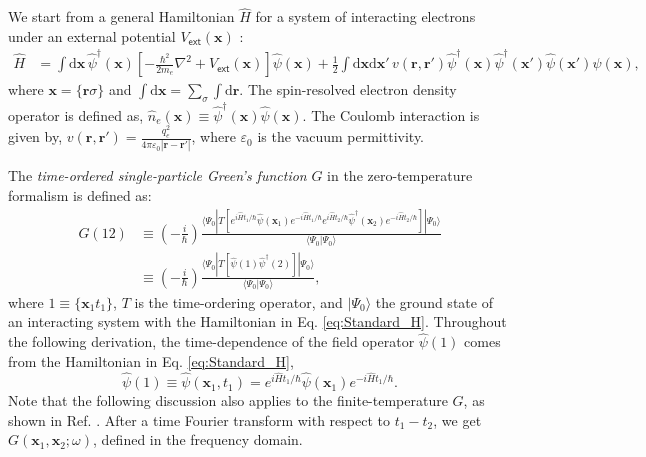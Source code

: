\documentclass[11pt, oneside]{article}          %
\begin{document}
We start from a general Hamiltonian $\hat{H}$ for a system of interacting electrons under an external potential $V_{\mathsf{ext}}({\bm x})$ \cite{cohen2016fundamentals, fetter2012quantum, mahan2013many, strinati1988application}:
\begin{equation}
  \label{eq:Standard_H}
  \begin{aligned}
    \hat{H} & = \int \mathrm{d}{\bm x} \, \hat{\psi}^{\dagger} ({\bm x}) \left [ -\frac{\hbar^2}{2m_e}\nabla^2 + V_{\mathsf{ext}} ({\bm x}) \right ] \hat{\psi}({\bm x}) + \frac{1}{2} \int \mathrm{d}{\bm x} \mathrm{d}{\bm x}' \, v({\bm r},{\bm r}') \hat{\psi}^{\dagger}({\bm x}) \hat{\psi}^{\dagger}({\bm x}') \hat{\psi}({\bm x}') \hat{\psi}({\bm x}),
  \end{aligned}
\end{equation}
where ${\bm x} = \{ {\bm r}\sigma \}$ and $\int \mathrm{d} {\bm x} = \sum_{\sigma} \int \mathrm{d}{\bm r}$. The spin-resolved electron density operator is defined as, $\hat{n}_e ({\bm x}) \equiv  \hat{\psi}^{\dagger}({\bm x}) \hat{\psi}({\bm x})$. The Coulomb interaction is given by, $v({\bm r},{\bm r}') = \frac{q_e^2}{4\pi \varepsilon_0|{\bm r}-{\bm r}'|}$, where $\varepsilon_0$ is the vacuum permittivity.

The \emph{time-ordered single-particle Green's function} $G$ in the zero-temperature formalism is defined as:
\begin{equation}
  \begin{aligned}
    \label{eq:def_GF}
    G(12) & \equiv (-\frac{i}{\hbar}) \frac{\langle \Psi_0 | T[ e^{i \hat{H} t_1 /\hbar} \hat{\psi}({\bm x}_1) e^{-i\hat{H} t_1 /\hbar} e^{i \hat{H} t_2 / \hbar} \hat{\psi}^{\dagger}({\bm x}_2) e^{-i \hat{H} t_2 / \hbar} ] | \Psi_0 \rangle}{\langle \Psi_0 | \Psi_0 \rangle} \\
    & \equiv (-\frac{i}{\hbar}) \frac{\langle \Psi_0 | T[ \hat{\psi}(1) \hat{\psi}^{\dagger}(2) ] | \Psi_0 \rangle}{\langle \Psi_0 | \Psi_0 \rangle},
  \end{aligned}
\end{equation}
where $1 \equiv \{ {\bm x}_1 t_1 \}$, $T$ is the time-ordering operator, and $|\Psi_0 \rangle$ the ground state of an interacting system with the Hamiltonian in Eq. \eqref{eq:Standard_H}. Throughout the following derivation, the time-dependence of the field operator $\hat{\psi}(1)$ comes from the Hamiltonian in Eq. \eqref{eq:Standard_H},
\begin{equation}
  \label{eq:Heisenberg_picture}
  \hat{\psi} (1) \equiv \hat{\psi}({\bm x}_1, t_1) = e^{i\hat{H}t_1/\hbar}\hat{\psi}({\bm x}_1)e^{-i\hat{H}t_1/\hbar}.
\end{equation}
Note that the following discussion also applies to the finite-temperature $G$, as shown in Ref. \cite{baym1961field}. After a time Fourier transform with respect to $t_1-t_2$, we get $G({\bm x}_1, {\bm x}_2; \omega)$, defined in the frequency domain.
\end{document}
